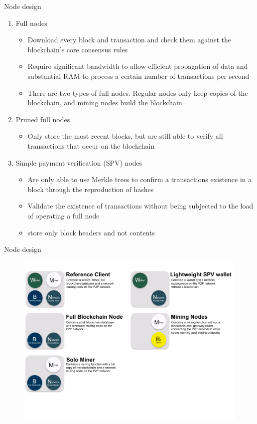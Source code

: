 \documentclass[9pt]{beamer}
\begin{document}
\begin{frame}{Node design}
	\begin{enumerate}
		\item Full nodes
			\begin{itemize}
				\item Download every block and transaction and check them against the blockchain's core consensus rules
				\item Require significant bandwidth to allow efficient propagation of data and substantial RAM to process a certain number of transactions per second
				\item There are two types of full nodes. Regular nodes only keep copies of the blockchain, and mining nodes build the blockchain
			\end{itemize}
		\item Pruned full nodes
			\begin{itemize}
				\item Only store the most recent blocks, but are still able to verify all transactions that occur on the blockchain
			\end{itemize}
		\item Simple payment verification (SPV) nodes
			\begin{itemize}
				\item Are only able to use Merkle trees to confirm a transactions existence in a block through the reproduction of hashes
				\item Validate the existence of transactions without being subjected to the load of operating a full node
				\item store only block headers and not contents
			\end{itemize}
	\end{enumerate}
\end{frame}


\begin{frame}{Node design}
	\begin{figure}[]
		\centering
		\includegraphics  [scale=0.35]{Images/nodes}
	\end{figure}
\end{frame}
\end{document}
